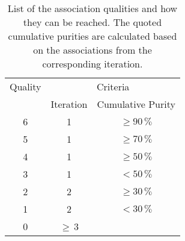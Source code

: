 
\begin{table}[h]
\begin{center}
\caption[Overview of the possible association qualities and how they can be obtained.]{List of the association qualities and how they can be reached. The quoted cumulative purities are calculated based on the associations from the corresponding iteration.}
\label{tab:AMWFQD}
\begin{tabular}{c c c}
Quality & \multicolumn{2}{c}{Criteria} \\
 & Iteration & Cumulative Purity \\
\midrule[2pt]
6 & 1 & $\geq 90\,\%$ \\
5 & 1 & $\geq 70\,\%$ \\
4 & 1 & $\geq 50\,\%$ \\
3 & 1 & $< 50\,\%$ \\
\midrule
2 & 2 & $\geq 30\,\%$ \\
1 & 2 & $< 30\,\%$ \\
\midrule
0 & $\geq$\,3 & \\
\end{tabular}
\end{center}
\end{table}